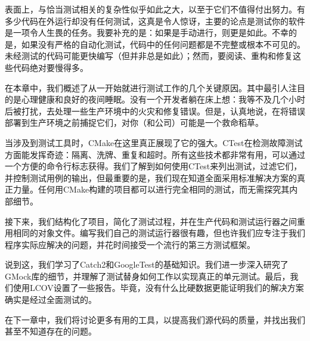 表面上，与恰当测试相关的复杂性似乎如此之大，以至于它们不值得付出努力。有多少代码在外运行却没有任何测试，这真是令人惊讶，主要的论点是测试你的软件是一项令人生畏的任务。我要补充的是：如果是手动进行，则更是如此。不幸的是，如果没有严格的自动化测试，代码中的任何问题都是不完整或根本不可见的。未经测试的代码可能更快编写（但并非总是如此）；然而，要阅读、重构和修复这些代码绝对要慢得多。

在本章中，我们概述了从一开始就进行测试工作的几个关键原因。其中最引人注目的是心理健康和良好的夜间睡眠。没有一个开发者躺在床上想：我等不及几个小时后被打扰，去处理一些生产环境中的火灾和修复错误。但是，认真地说，在将错误部署到生产环境之前捕捉它们，对你（和公司）可能是一个救命稻草。

当涉及到测试工具时，CMake在这里真正展现了它的强大。CTest在检测故障测试方面能发挥奇迹：隔离、洗牌、重复和超时。所有这些技术都非常有用，可以通过一个方便的命令行标志获得。我们了解到如何使用CTest来列出测试，过滤它们，并控制测试用例的输出，但最重要的是，我们现在知道全面采用标准解决方案的真正力量。任何用CMake构建的项目都可以进行完全相同的测试，而无需探究其内部细节。

接下来，我们结构化了项目，简化了测试过程，并在生产代码和测试运行器之间重用相同的对象文件。编写我们自己的测试运行器很有趣，但也许我们应专注于我们程序实际应解决的问题，并花时间接受一个流行的第三方测试框架。

说到这，我们学习了Catch2和GoogleTest的基础知识。我们进一步深入研究了GMock库的细节，并理解了测试替身如何工作以实现真正的单元测试。最后，我们使用LCOV设置了一些报告。毕竟，没有什么比硬数据更能证明我们的解决方案确实是经过全面测试的。

在下一章中，我们将讨论更多有用的工具，以提高我们源代码的质量，并找出我们甚至不知道存在的问题。